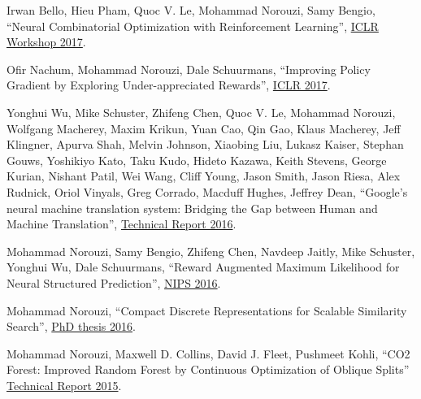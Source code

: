 \documentclass[10pt,letterpaper]{article}
\renewenvironment{itemize}{
  \begin{list}{}{
    \setlength{\leftmargin}{1.5em}
  }
}{
  \end{list}
}
\begin{document}
\begin{itemize}

\item Irwan Bello, Hieu Pham, Quoc V. Le, Mohammad Norouzi, Samy Bengio,
``Neural Combinatorial Optimization with Reinforcement Learning'',
\href{https://arxiv.org/pdf/1611.09940}%
{ICLR Workshop 2017}.

\item Ofir Nachum, Mohammad Norouzi, Dale Schuurmans,
``Improving Policy Gradient by Exploring Under-appreciated Rewards'',
\href{https://arxiv.org/pdf/1611.09321}{ICLR 2017}.

\item Yonghui Wu, Mike Schuster, Zhifeng Chen, Quoc V. Le, Mohammad Norouzi, Wolfgang Macherey, Maxim Krikun, Yuan Cao, Qin Gao, Klaus Macherey, Jeff Klingner, Apurva Shah, Melvin Johnson, Xiaobing Liu, Lukasz Kaiser, Stephan Gouws, Yoshikiyo Kato, Taku Kudo, Hideto Kazawa, Keith Stevens, George Kurian, Nishant Patil, Wei Wang, Cliff Young, Jason Smith, Jason Riesa, Alex Rudnick, Oriol Vinyals, Greg Corrado, Macduff Hughes, Jeffrey Dean,
``Google's neural machine translation system: Bridging the Gap between Human and Machine Translation'',
\href{https://arxiv.org/pdf/1609.08144}%
{Technical Report 2016}.
  
\item
Mohammad Norouzi, Samy Bengio, Zhifeng Chen, Navdeep Jaitly, Mike Schuster, Yonghui Wu, Dale Schuurmans,
``Reward Augmented Maximum Likelihood for Neural Structured Prediction'',
\href{https://arxiv.org/pdf/1609.00150.pdf}%
{NIPS 2016}.

\item
Mohammad Norouzi, ``Compact Discrete Representations for Scalable Similarity Search'',
\href{https://tspace.library.utoronto.ca/bitstream/1807/73095/3/Norouzi_Mohammad_201606_PhD_thesis.pdf}{PhD thesis 2016}.

\item
Mohammad Norouzi, Maxwell D. Collins, David J. Fleet, Pushmeet Kohli,
``CO2 Forest: Improved Random Forest by Continuous Optimization of Oblique Splits''
\href{https://arxiv.org/pdf/1506.06155}%
{Technical Report 2015}.


\end{itemize}
\end{document}
